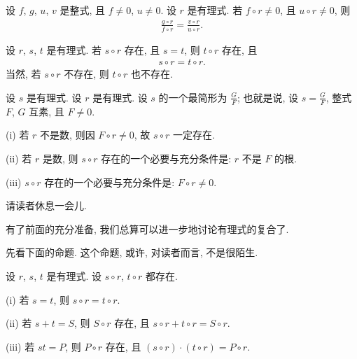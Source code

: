 \begin{proposition}
    设 $f$, $g$, $u$, $v$ 是整式, 且 $f \neq 0$, $u \neq 0$. 设 $r$ 是有理式. 若 $f \circ r \neq 0$, 且 $u \circ r \neq 0$, 则
    \begin{align*}
        \frac{g \circ r}{f \circ r} = \frac{v \circ r}{u \circ r}.
    \end{align*}
\end{proposition}

\begin{proposition}
    设 $r$, $s$, $t$ 是有理式. 若 $s \circ r$ 存在, 且 $s = t$, 则 $t \circ r$ 存在, 且
    \begin{align*}
        s \circ r = t \circ r.
    \end{align*}
    当然, 若 $s \circ r$ 不存在, 则 $t \circ r$ 也不存在.
\end{proposition}

\begin{proposition}
    设 $s$ 是有理式. 设 $r$ 是有理式. 设 $s$ 的一个最简形为 $\frac{G}{F}$; 也就是说, 设 $s = \frac{G}{F}$, 整式 $F$, $G$ 互素, 且 $F \neq 0$.

    (i) 若 $r$ 不是数, 则因 $F \circ r \neq 0$, 故 $s \circ r$ 一定存在.

    (ii) 若 $r$ 是数, 则 $s \circ r$ 存在的一个必要与充分条件是: $r$ 不是 $F$ 的根.

    (iii) $s \circ r$ 存在的一个必要与充分条件是: $F \circ r \neq 0$.
\end{proposition}

请读者休息一会{\scriptsize 儿}.

\myLine

有了前面的充分准备, 我们总算可以进一步地讨论有理式的复合了.

先看下面的命题. 这个命题, 或许, 对读者而言, 不是很陌生.

\begin{proposition}
    设 $r$, $s$, $t$ 是有理式. 设 $s \circ r$, $t \circ r$ 都存在.

    (i) 若 $s = t$, 则 $s \circ r = t \circ r$.

    (ii) 若 $s + t = S$, 则 $S \circ r$ 存在, 且 $s \circ r + t \circ r = S \circ r$.

    (iii) 若 $st = P$, 则 $P \circ r$ 存在, 且 $(s \circ r) \cdot (t \circ r) = P \circ r$.
\end{proposition}

